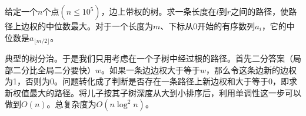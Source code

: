 \begin{prob}
	给定一个$n$个点$(n \le 10^5)$，边上带权的树。求一条长度在$l$到$r$之间的路径，使路径上边权的中位数最大。对于一个长度为$m$、下标从0开始的有序数列$a_i$，它的中位数是$a_{\lfloor m/2 \rfloor}$。
\end{prob}

\begin{sol}
	典型的树分治。于是我们只用考虑在一个子树中经过根的路径。首先二分答案（局部二分比全局二分要快）$w$。如果一条边边权大于等于$w$，那么令这条边新的边权为1，否则为0。问题转化成了判断是否存在一条路径上新边权和大于等于0，即求新权值最大的路径。将儿子按其子树深度从大到小排序后，利用单调性这一步可以做到$O(n)$。总复杂度为$O(n \log^2 n)$。
\end{sol}
